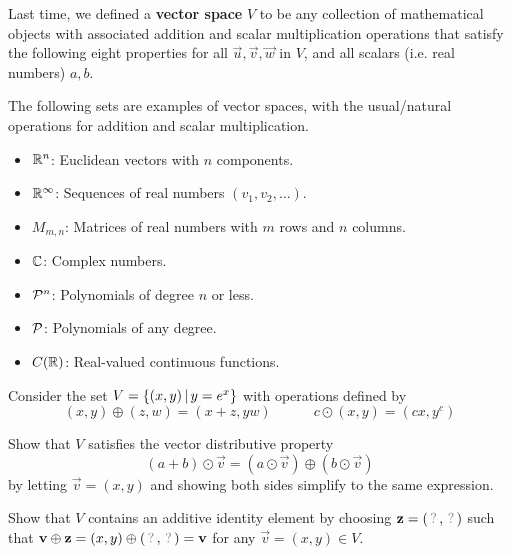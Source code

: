 \begin{applicationActivities}
\begin{remark}
  Last time, we defined a \textbf{vector space} \(V\) to be any collection of
  mathematical objects with
  associated addition and scalar multiplication operations that satisfy
  the following eight properties for all \(\vec u,\vec v,\vec w\) in \(V\),
  and all scalars (i.e. real numbers) \(a,b\).

  \vecorSpaceProperties
\end{remark}

\begin{remark}
  The following sets are examples of vector spaces, with the usual/natural
  operations for addition and scalar multiplication.
  \begin{itemize}
    \item \(\IR^n\): Euclidean vectors with \(n\) components.
    \item \(\IR^\infty\): Sequences of real numbers \((v_1,v_2,\dots)\).
    \item \(M_{m,n}\): Matrices of real numbers with \(m\) rows and
          \(n\) columns.
    \item \(\IC\): Complex numbers.
    \item \(\P^n\): Polynomials of degree \(n\) or less.
    \item \(\P\): Polynomials of any degree.
    \item \(C(\IR)\): Real-valued continuous functions.
  \end{itemize}
\end{remark}

\begin{activity}{20}
  Consider the set \(V=\setBuilder{(x,y)}{y=e^x}\) with operations defined by
  \[
    (x,y)\oplus (z,w)=(x+z,yw)
      \hspace{3em}
    c\odot (x,y)=(cx,y^c)
  \]
  \begin{subactivity}
  Show that $V$ satisfies the vector distributive property
  \[(a+b)\odot\vec v=(a\odot\vec v)\oplus (b\odot\vec v)\]
  by letting \(\vec v=(x,y)\) and showing both sides simplify to the same
  expression.
  \end{subactivity}
  \begin{subactivity}%
  Show that $V$ contains an additive identity element by choosing
  \(\vec{z}=(\unknown,\unknown)\) such that
  \(\vec{v}\oplus\vec{z}=(x,y)\oplus(\unknown,\unknown)=\vec{v}\)
  for any \(\vec{v}=(x,y)\in V\).
  \end{subactivity}
\end{activity}



\end{applicationActivities}

